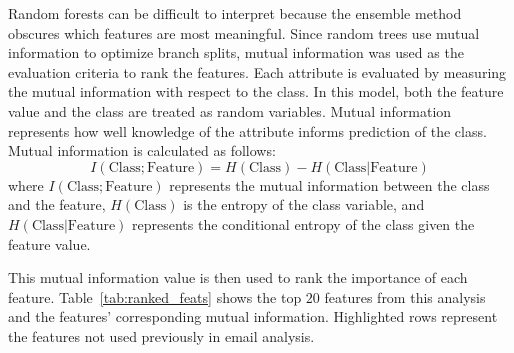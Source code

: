 \documentclass[10pt,twocolumn,conference]{IEEEtran}
\begin{document}
Random forests can be difficult to interpret because the ensemble method obscures which features are most meaningful.
Since random trees use mutual information to optimize branch splits, mutual information was used as the evaluation criteria to rank the features.
Each attribute is evaluated by measuring the mutual information with respect to the class.
In this model, both the feature value and the class are treated as random variables.
Mutual information represents how well knowledge of the attribute informs prediction of the class.
Mutual information is calculated as follows:
\begin{equation}
I(\text{Class}; \text{Feature}) = H(\text{Class}) - H(\text{Class} | \text{Feature})
\end{equation} \label{eq:info_gained}
\hspace{-\parindent}
where $I(\text{Class}; \text{Feature})$ represents the mutual information between the class and the feature, $H(\text{Class})$ is the entropy of the class variable, and  $H(\text{Class} | \text{Feature})$ represents the conditional entropy of the class given the feature value.  

This mutual information value is then used to rank the importance of each feature.
Table~\ref{tab:ranked_feats} shows the top $20$ features from this analysis and the features' corresponding mutual information.
Highlighted rows represent the features not used previously in email analysis.
\end{document}
